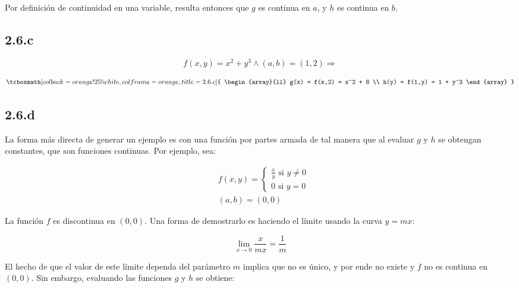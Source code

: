 \documentclass{article}
\begin{document}
Por definición de continuidad en una variable, resulta entonces que $g$ es continua en $a$, y $h$ es continua en $b$.

\subsection*{2.6.c}
\label{subsec:2.6.c}

\begin{equation}
f(x,y) = x^2 + y^3 \wedge (a,b) = (1,2) \Rightarrow
\end{equation}

\begin{equation}
\tcboxmath[colback=orange!25!white,colframe=orange,title=2.6.c]
{ \begin{array}{ll}
g(x) = f(x,2) = x^2 + 8 \\
h(y) = f(1,y) = 1 + y^3
\end{array} }
\end{equation}

\subsection*{2.6.d}
\label{subsec:2.6.d}

La forma más directa de generar un ejemplo es con una función por partes armada de tal manera que al evaluar $g$ y $h$ se obtengan constantes, que son funciones continuas. Por ejemplo, sea:

\begin{subequations}
\begin{align}
& f(x,y) = \left\{ \begin{array}{ll}
\frac{x}{y} \text{ si } y \neq 0 \\
0 \text{ si } y = 0
\end{array} \right. \\
& (a,b) = (0,0)
\end{align}
\end{subequations}

La función $f$ es discontinua en $(0,0)$. Una forma de demostrarlo es haciendo el límite usando la curva $y = m x$:

\begin{equation}
\lim_{x \rightarrow 0} \frac{x}{mx} = \frac{1}{m}
\end{equation}

El hecho de que el valor de este límite dependa del parámetro $m$ implica que no es único, y por ende no existe y $f$ no es continua en $(0,0)$. Sin embargo, evaluando las funciones $g$ y $h$ se obtiene:
\end{document}

